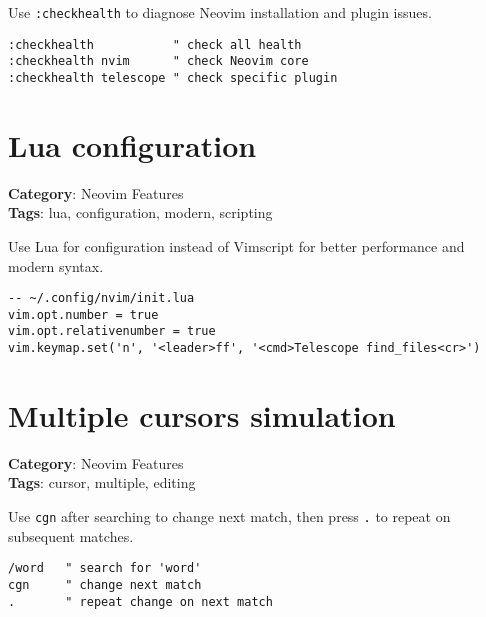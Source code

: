 {{{{{{{{{Use {\footnotesize \Verb§:checkhealth§} to diagnose Neovim installation and plugin issues.

\begin{Exa*}{}
\begin{Verbatim}[fontsize=\footnotesize, breaklines, breakanywhere]
:checkhealth           " check all health
:checkhealth nvim      " check Neovim core
:checkhealth telescope " check specific plugin
\end{Verbatim}
\end{Exa*}

\section{Lua configuration}

\textbf{Category}: Neovim Features\\ \textbf{Tags}: lua, configuration, modern, scripting
\vspace{0.5cm}

Use Lua for configuration instead of Vimscript for better performance and modern syntax.

\begin{Exa*}{}
\begin{Verbatim}[fontsize=\footnotesize, breaklines, breakanywhere]
-- ~/.config/nvim/init.lua
vim.opt.number = true
vim.opt.relativenumber = true
vim.keymap.set('n', '<leader>ff', '<cmd>Telescope find_files<cr>')
\end{Verbatim}
\end{Exa*}

\section{Multiple cursors simulation}

\textbf{Category}: Neovim Features\\ \textbf{Tags}: cursor, multiple, editing
\vspace{0.5cm}

Use {\footnotesize \Verb§cgn§} after searching to change next match, then press {\footnotesize \Verb§.§} to repeat on subsequent matches.

\begin{Exa*}{}
\begin{Verbatim}[fontsize=\footnotesize, breaklines, breakanywhere]
/word   " search for 'word'
cgn     " change next match
.       " repeat change on next match
\end{Verbatim}
\end{Exa*}

}}}}}}}}}
